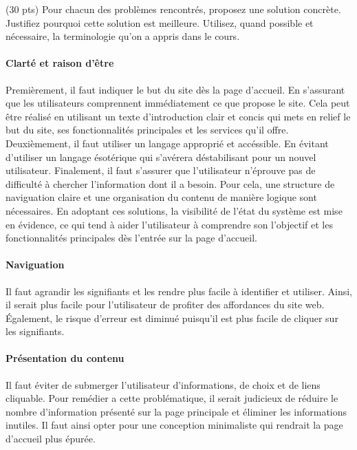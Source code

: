\documentclass[9pt]{report}
\begin{document}
\begin{multicols*}{2}
  \begin{Exercice}{(30 pts)}{}
     Pour chacun des problèmes rencontrés, proposez une solution concrète. 
     Justifiez pourquoi cette solution est meilleure. Utilisez, 
     quand possible et nécessaire, la terminologie qu’on a appris dans 
     le cours.     
  \end{Exercice}

  \paragraph{Clarté et raison d'être}
Premièrement, il faut indiquer le but du site dès la page d’accueil. En s’assurant que les utilisateurs comprennent immédiatement ce que propose le site. Cela peut être réalisé en utilisant un texte d’introduction clair et concis qui mets en relief le but du site, ses fonctionnalités principales et les services qu’il offre.
Deuxièmement, il faut utiliser un langage approprié et accéssible. En évitant d’utiliser un langage ésotérique qui s’avérera déstabilisant pour un nouvel utilisateur.
Finalement, il faut s’assurer que l’utilisateur n'éprouve pas de difficulté à chercher l’information dont il a besoin. Pour cela, une structure de naviguation claire et une organisation du contenu de manière logique sont nécessaires.
En adoptant ces solutions, la visibilité de l’état du système est mise en évidence, ce qui tend à aider l’utilisateur à comprendre son l'objectif et les fonctionnalités principales dès l’entrée sur la page d’accueil.

  \paragraph{Naviguation}
Il faut agrandir les signifiants et les rendre plus facile à identifier et utiliser. Ainsi, il serait plus facile pour l’utilisateur de profiter des affordances du site web. Également, le risque d’erreur est diminué puisqu’il est plus facile de cliquer sur les signifiants.

  \paragraph{Présentation du contenu}
Il faut éviter de submerger l’utilisateur d'informations, de choix et de liens cliquable. Pour remédier a cette problématique, il serait judicieux de réduire le nombre d’information présenté sur la page principale et éliminer les informations inutiles.
Il faut ainsi opter pour une 
conception minimaliste qui rendrait la page d’accueil plus épurée.


\end{multicols*}
\end{document}

